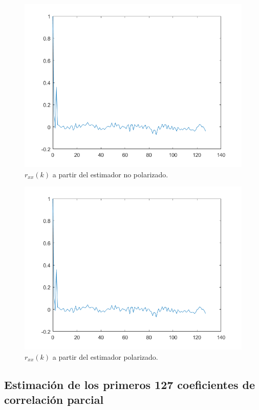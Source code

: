 \begin{figure}[H] %
\centering
\includegraphics[scale=0.45]{../EJ1/rxxNP}
\caption{$r_{xx}(k)$ a partir del estimador no polarizado.}
\label{rxxNP}
\end{figure}

\begin{figure}[H] %
\centering
\includegraphics[scale=0.45]{../EJ1/rxxP}
\caption{$r_{xx}(k)$ a partir del estimador polarizado.}
\label{rxxP}
\end{figure}

\subsection{Estimaci\'on de los primeros 127 coeficientes de correlaci\'on parcial}

